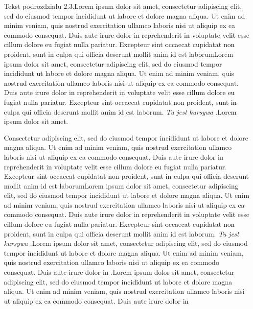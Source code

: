 \documentclass[12pt,a4paper,titlepage]{article}
\begin{document}
Tekst podrozdziału 2.3.Lorem ipsum dolor sit amet, consectetur adipiscing elit, sed do eiusmod tempor incididunt ut labore et dolore magna aliqua. Ut enim ad minim veniam, quis nostrud exercitation ullamco laboris nisi ut aliquip ex ea commodo consequat. Duis aute irure dolor in reprehenderit in voluptate velit esse cillum dolore eu fugiat nulla pariatur. Excepteur sint occaecat cupidatat non proident, sunt in culpa qui officia deserunt mollit anim id est laborumLorem ipsum dolor sit amet, consectetur adipiscing elit, sed do eiusmod tempor incididunt ut labore et dolore magna aliqua.  Ut enim ad minim veniam, quis nostrud exercitation ullamco laboris nisi ut aliquip ex ea commodo consequat. Duis aute irure dolor in reprehenderit in voluptate velit esse cillum dolore eu fugiat nulla pariatur. Excepteur sint occaecat cupidatat non proident, sunt in culpa qui officia deserunt mollit anim id est laborum.  \textit{Tu jest kursywa} .Lorem ipsum dolor sit amet. \par Consectetur adipiscing elit, sed do eiusmod tempor incididunt ut labore et dolore magna aliqua. Ut enim ad minim veniam, quis nostrud exercitation ullamco laboris nisi ut aliquip ex ea commodo consequat. Duis aute irure dolor in reprehenderit in voluptate velit esse cillum dolore eu fugiat nulla pariatur. Excepteur sint occaecat cupidatat non proident, sunt in culpa qui officia deserunt mollit anim id est laborumLorem ipsum dolor sit amet, consectetur adipiscing elit, sed do eiusmod tempor incididunt ut labore et dolore magna aliqua.  Ut enim ad minim veniam, quis nostrud exercitation ullamco laboris nisi ut aliquip ex ea commodo consequat. Duis aute irure dolor in reprehenderit in voluptate velit esse cillum dolore eu fugiat nulla pariatur. Excepteur sint occaecat cupidatat non proident, sunt in culpa qui officia deserunt mollit anim id est laborum.  \textit{Tu jest kursywa} .Lorem ipsum dolor sit amet, consectetur adipiscing elit, sed do eiusmod tempor incididunt ut labore et dolore magna aliqua. Ut enim ad minim veniam, quis nostrud exercitation ullamco laboris nisi ut aliquip ex ea commodo consequat. Duis aute irure dolor in .Lorem ipsum dolor sit amet, consectetur adipiscing elit, sed do eiusmod tempor incididunt ut labore et dolore magna aliqua. Ut enim ad minim veniam, quis nostrud exercitation ullamco laboris nisi ut aliquip ex ea commodo consequat. Duis aute irure dolor in 
\end{document}
